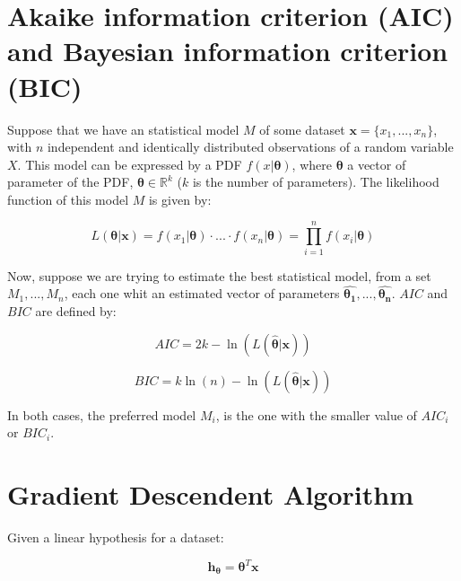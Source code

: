 \section{Akaike information criterion (AIC) and Bayesian information criterion (BIC)}

Suppose that we have an statistical model $M$ of some dataset ${\boldsymbol{x} = \{x_1, ..., x_n}\}$, with $n$ independent and identically distributed observations of a random variable $X$. This model can be expressed by a PDF $f(x| \boldsymbol{\theta})$, where $\boldsymbol{\theta}$ a vector of parameter of the PDF, $\boldsymbol{\theta} \in \mathbb{R}^{k}$ ($k$ is the number of parameters). The  likelihood function  of this model $M$ is given by:

\begin{equation}
L(\boldsymbol{\theta}|\boldsymbol{x} ) =  f(x_1|\boldsymbol{\theta})\cdot...\cdot f(x_n|\boldsymbol{\theta}) = \prod_{i = 1}^{n}f(x_i|\boldsymbol{\theta})
\end{equation}

Now, suppose we are trying to estimate the best statistical model, from a set ${M_1, ..., M_n}$, each one whit an estimated vector of parameters  ${\boldsymbol{\hat{\theta_1}}}, ..., {\boldsymbol{\hat{\theta_n}}}$. $AIC$ and $BIC$ are defined by:

\begin{equation}
\label{eq:aic-ap}
AIC = 2k - \ln(L(\boldsymbol{\hat{\theta}}|\boldsymbol{x}))
\end{equation}

\begin{equation}
\label{eq:bic-ap}
BIC = k\ln(n) - \ln(L(\boldsymbol{\hat{\theta}}|\boldsymbol{x}))
\end{equation}

In both cases, the preferred model $M_i$, is the one with the smaller value of $AIC_i$ or $BIC_i$.


\section{Gradient Descendent Algorithm}

Given a linear hypothesis for a dataset:

\begin{equation}
	\boldsymbol{h_{\theta}} = \boldsymbol{\theta}^{T}\boldsymbol{x} 
\end{equation}

